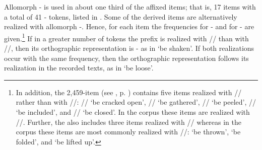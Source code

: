 Allomorph - is used in about one third of the affixed items; that is, 17 items with a total of 41 - tokens, listed in . Some of the derived items are alternatively realized with allomorph -. Hence, for each item the frequencies for - and for - are given.\footnote{In addition, the 2,459-item  (see , p. \pageref{Para_2}) contains five items realized with // rather than with //: // ‘be cracked open’, // ‘be gathered’, // ‘be peeled’, // ‘be included’, and // ‘be closed’. In the corpus these items are realized with //. Further, the  also includes three items realized with // whereas in the corpus these items are most commonly realized with //:  ‘be thrown’,  ‘be folded’, and  ‘be lifted up’.} If in a greater number of tokens the prefix is realized with // than with //, then its orthographic representation is - as in  ‘be shaken’. If both realizations occur with the same frequency, then the orthographic representation follows its realization in the recorded texts, as in  ‘be loose’.


